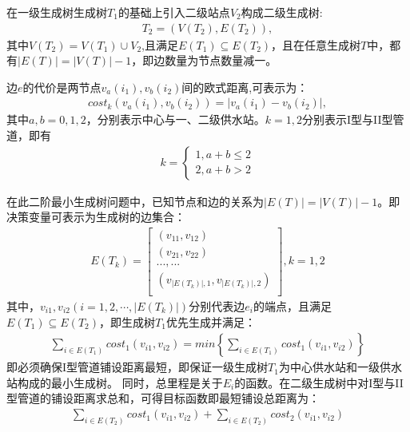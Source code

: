 \documentclass{whutmod}
\begin{document}
		在一级生成树生成树$T_1$的基础上引入二级站点$V_2$构成二级生成树:
		\begin{gather*}	
		T_{2}=(V(T_{2}),E(T_{2})),
		\end{gather*}
		其中$V(T_{2})=V(T_{1})\cup V_2$,且满足$E(T_{1})\subseteq  E(T_{2})$，且在任意生成树$T$中，都有$|E(T)|=|V(T)|-1$，即边数量为节点数量减一。
		
		边$e$的代价是两节点$v_a(i_1), v_b(i_2)$间的欧式距离,可表示为：
		\begin{gather}
		cost_{k}(v_a(i_1),v_b(i_2))=\left | v_a(i_1)-v_b(i_2) \right |,
		\end{gather}
		其中$a,b=0,1,2$，分别表示中心与一、二级供水站。$k=1,2$分别表示I型与II型管道，即有
			\begin{gather}
			k=\left\{\begin{matrix}1,a+b\leqslant 2
			\\ 2,a+b>2
			\end{matrix}\right.
			\end{gather}
		
		
		
		
			在此二阶最小生成树问题中，已知节点和边的关系为$|E(T)|=|V(T)|-1 $。即决策变量可表示为生成树的边集合：
			\begin{gather}
			E(T_k)=
			\begin{bmatrix}
			(v_{11} ,v_{12}) \\ 
			(v_{21} ,v_{22} )\\ 
			...,...\\
			(v_{|E(T_k)|,1},v_{|E(T_k)|,2})\\
			\end{bmatrix},k=1,2
			\end{gather}
			其中，$v_{i1}, v_{i2}(i =1,2,\cdots,|E(T_k)|)$分别代表边$e_i$的端点，且满足$E(T_1)\subseteq E(T_2)$，即生成树$T_1$优先生成并满足：
			\begin{gather}
			\sum_{i\in E(T_1) }cost_1(v_{i1},v_{i2})=min\left \{ 	\sum_{i\in E(T_1) }cost_1(v_{i1},v_{i2}) \right \}
			\end{gather}
			即必须确保I型管道铺设距离最短，即保证一级生成树$T_1$为中心供水站和一级供水站构成的最小生成树。
			 同时，总里程是关于$E_{i}$的函数。在二级生成树中对I型与II型管道的铺设距离求总和，可得目标函数即最短铺设总距离为：
			\begin{gather}
	         	\sum_{i\in E(T_2) }cost_1(v_{i1},v_{i2})+\sum_{i\in E(T_2) }cost_2(v_{i1},v_{i2})
			\end{gather}
			
\end{document}

